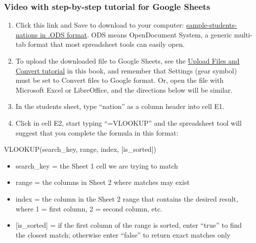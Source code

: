 \documentclass[
  english,
]{book}
\newenvironment{Shaded}{\begin{snugshade}}{\end{snugshade}}
\newcommand{\NormalTok}[1]{#1}
\providecommand{\tightlist}{%
  \setlength{\itemsep}{0pt}\setlength{\parskip}{0pt}}
\begin{document}
\hypertarget{video-with-step-by-step-tutorial-for-google-sheets-1}{%
\subsubsection*{Video with step-by-step tutorial for Google Sheets}\label{video-with-step-by-step-tutorial-for-google-sheets-1}}

\begin{enumerate}
\def\labelenumi{\arabic{enumi})}
\item
  Click this link and Save to download to your computer: \href{data/sample-students-nations.ods}{sample-students-nations in .ODS format}. ODS means OpenDocument System, a generic multi-tab format that most spreadsheet tools can easily open.
\item
  To upload the downloaded file to Google Sheets, see the \href{upload}{Upload Files and Convert tutorial} in this book, and remember that Settings (gear symbol) must be set to Convert files to Google format. Or, open the file with Microsoft Excel or LibreOffice, and the directions below will be similar.
\item
  In the students sheet, type ``nation'' as a column header into cell E1.
\item
  Click in cell E2, start typing ``=VLOOKUP'' and the spreadsheet tool will suggest that you complete the formula in this format:
\end{enumerate}

\begin{Shaded}
\begin{Highlighting}[]
\NormalTok{VLOOKUP(search\_key, range, index, [is\_sorted])}
\end{Highlighting}
\end{Shaded}

\begin{itemize}
\tightlist
\item
  search\_key = the Sheet 1 cell we are trying to match
\item
  range = the columns in Sheet 2 where matches may exist
\item
  index = the column in the Sheet 2 range that contains the desired result, where 1 = first column, 2 = second column, etc.
\item
  {[}is\_sorted{]} = if the first column of the range is sorted, enter ``true'' to find the closest match; otherwise enter ``false'' to return exact matches only
\end{itemize}
\end{document}
